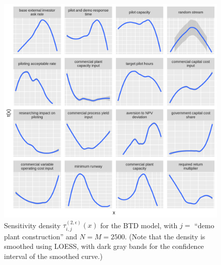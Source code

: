\documentclass[12pt]{article}
\begin{document}
\begin{figure}
    \centering
    \includegraphics[width=\linewidth]{figures/btd-tau.png}
    \caption{Sensitivity density $\tau_{i,j}^{(2,\epsilon)}(x)$ for the BTD model, with $j =$ ``demo plant construction'' and $N = M = 2500$. (Note that the density is smoothed using LOESS, with dark gray bands for the confidence interval of the smoothed curve.)}
    \label{fig:btd-tau}
\end{figure}
\end{document}
